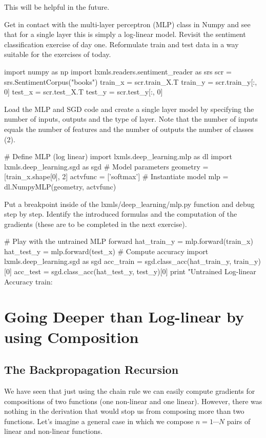 \noindent This will be helpful in the future.

\begin{exercise}
Get in contact with the multi-layer perceptron (MLP) class in Numpy and see
that for a single layer this is simply a log-linear model. Revisit the
sentiment classification exercise of day one. Reformulate train and test data
in a way suitable for the exercises of today.  
\begin{python}
import numpy as np
import lxmls.readers.sentiment_reader as srs  
scr     = srs.SentimentCorpus("books")
train_x = scr.train_X.T
train_y = scr.train_y[:, 0]
test_x  = scr.test_X.T
test_y  = scr.test_y[:, 0]
\end{python}
%
Load the MLP and SGD code and create a single layer model by specifying the
number of inputs, outputs and the type of layer. Note that the number of inputs
equals the number of features and the number of outputs the number of classes
(2).
%
\begin{python}
# Define MLP (log linear)
import lxmls.deep_learning.mlp as dl
import lxmls.deep_learning.sgd as sgd
# Model parameters
geometry = [train_x.shape[0], 2]
actvfunc = ['softmax']
# Instantiate model
mlp      = dl.NumpyMLP(geometry, actvfunc)
\end{python}
Put a breakpoint inside of the lxmls/deep\_learning/mlp.py function and debug
step by step. Identify the introduced formulas and the computation of the
gradients (these are to be completed in the next exercise). 
\begin{python}
# Play with the untrained MLP forward
hat_train_y = mlp.forward(train_x) 
hat_test_y  = mlp.forward(test_x) 
# Compute accuracy
import lxmls.deep_learning.sgd as sgd
acc_train = sgd.class_acc(hat_train_y, train_y)[0]
acc_test  = sgd.class_acc(hat_test_y, test_y)[0]
print "Untrained Log-linear Accuracy train: %
\end{python}
\end{exercise}

\section{Going Deeper than Log-linear by using Composition}

\subsection{The Backpropagation Recursion}

We have seen that just using the chain rule we can easily compute gradients for
compositions of two functions (one non-linear and one linear). However, there
was nothing in the derivation that would stop us from composing more than two
functions. Let's imagine a general case in which we compose $n=1 \cdots N$
pairs of linear and non-linear functions.

